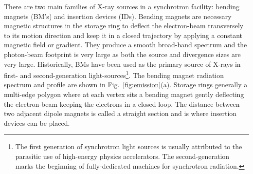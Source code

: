 \begin{refsection}
There are two main families of X-ray sources in a synchrotron facility: bending magnets (BM's) and insertion devices (IDs). Bending magnets are necessary magnetic structures in the storage ring to deflect the electron-beam transversely to its motion direction and keep it in a closed trajectory by applying a constant magnetic field or gradient. They produce a smooth broad-band spectrum and the photon-beam footprint is very large as both the source and divergence sizes are very large. Historically, BMs have been used as the primary source of X-rays in first- and second-generation light-sources\footnote{The first generation of synchrotron light sources is usually attributed to the parasitic use of high-energy physics accelerators. The second-generation marks the beginning of fully-dedicated machines for synchrotron radiation.}. The bending magnet radiation spectrum and profile are shown in Fig.~\ref{fig:emission}(a). Storage rings  generally a multi-edge polygon where at each vertex sits a bending magnet gently deflecting the electron-beam keeping the electrons in a closed loop. The distance between two adjacent dipole magnets is called a straight section and is where insertion devices can be placed.


\end{refsection}
